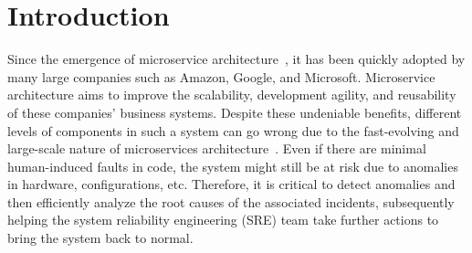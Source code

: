 \section{Introduction}

\label{sec:intro}
Since the emergence of microservice  architecture~\cite{balalaie2016microservices}, it has been quickly adopted by many large companies such as Amazon, Google, and Microsoft.
Microservice architecture aims to improve the scalability, development agility, and reusability of these companies' business systems.
Despite these undeniable benefits, different levels of components in such a system can go wrong 
due to the fast-evolving and large-scale nature of microservices architecture~\cite{balalaie2016microservices}. 
Even if there are minimal human-induced faults in code, the system might still be at risk due to anomalies in hardware, configurations, etc. 
Therefore, it is critical to detect anomalies and then efficiently analyze the root causes of the associated incidents, subsequently helping the system reliability 
engineering (SRE) team take further actions to bring the system back to normal.

